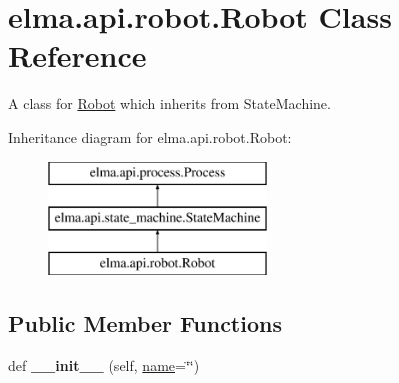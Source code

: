 \hypertarget{classelma_1_1api_1_1robot_1_1Robot}{}\section{elma.\+api.\+robot.\+Robot Class Reference}
\label{classelma_1_1api_1_1robot_1_1Robot}


A class for \hyperlink{classelma_1_1api_1_1robot_1_1Robot}{Robot} which inherits from State\+Machine.  


Inheritance diagram for elma.\+api.\+robot.\+Robot\+:\begin{figure}[H]
\begin{center}
\leavevmode
\includegraphics[height=3.000000cm]{classelma_1_1api_1_1robot_1_1Robot}
\end{center}
\end{figure}
\subsection*{Public Member Functions}
\begin{DoxyCompactItemize}
\item 
\mbox{\label{classelma_1_1api_1_1robot_1_1Robot_aa569723562580d98b16ef858b85c5154}} 
def {\bfseries \+\_\+\+\_\+init\+\_\+\+\_\+} (self, \hyperlink{classelma_1_1api_1_1process_1_1Process_affa061fab12e699d4d04471bfaf52a1a}{name}=\char`\"{}\char`\"{})
\end{DoxyCompactItemize}

